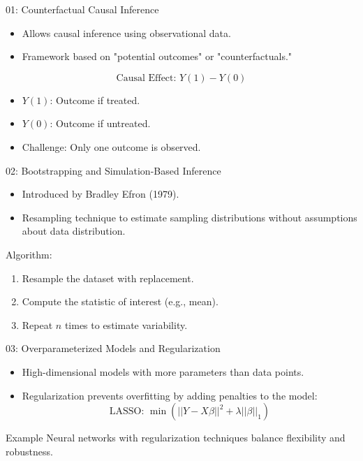 \documentclass{beamer}
\begin{document}
\begin{frame}{01: Counterfactual Causal Inference}
\begin{itemize}
    \item Allows causal inference using observational data.
    \item Framework based on "potential outcomes" or "counterfactuals."
\end{itemize}

\[
\text{Causal Effect: } Y(1) - Y(0)
\]
\begin{itemize}
    \item \( Y(1) \): Outcome if treated.
    \item \( Y(0) \): Outcome if untreated.
    \item Challenge: Only one outcome is observed.
\end{itemize}
\end{frame}

\begin{frame}{02: Bootstrapping and Simulation-Based Inference}
\begin{itemize}
    \item Introduced by Bradley Efron (1979).
    \item Resampling technique to estimate sampling distributions without assumptions about data distribution.
\end{itemize}

\begin{exampleblock}{Algorithm:}
\begin{enumerate}
    \item Resample the dataset with replacement.
    \item Compute the statistic of interest (e.g., mean).
    \item Repeat \( n \) times to estimate variability.
\end{enumerate}
\end{exampleblock}
\end{frame}

\begin{frame}{03: Overparameterized Models and Regularization}
\begin{itemize}
    \item High-dimensional models with more parameters than data points.
    \item Regularization prevents overfitting by adding penalties to the model:
    \[
    \text{LASSO: } \min \left( ||Y - X\beta||^2 + \lambda ||\beta||_1 \right)
    \]
\end{itemize}

\begin{block}{Example}
Neural networks with regularization techniques balance flexibility and robustness.
\end{block}
\end{frame}
\end{document}
